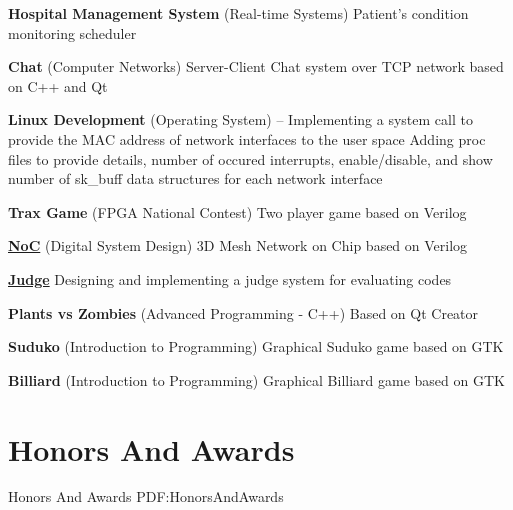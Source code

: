 \documentclass[a4paper,9pt,oneside]{article}
\begin{document}
\begin{body}
\BulletItem
\textbf{Hospital Management System} (Real-time Systems)
\hfill
{}
\SubBulletItem
Patient's condition monitoring scheduler


\BulletItem
\textbf{Chat} (Computer Networks)
\hfill
{}
\SubBulletItem
Server-Client Chat system over TCP network based on C++ and Qt

\BulletItem
\textbf{Linux Development} (Operating System)
\hfill
{} -- 
\SubBulletItem
Implementing a system call to provide the MAC address of network interfaces to the user space
\SubBulletItem
Adding proc files to provide details, number of occured interrupts, enable/disable, and show number of sk\_buff data structures for each network interface

\BulletItem
\textbf{Trax Game} (FPGA National Contest)
\hfill
{}
\SubBulletItem
Two player game based on Verilog

\BulletItem
\href{https://github.com/arminvakil/NoC}
{\textbf{NoC}} (Digital System Design)
\hfill
{}
\SubBulletItem
3D Mesh Network on Chip based on Verilog

\BulletItem
\href{https://github.com/Rmin1995/Judge}
{\textbf{Judge}}
\hfill
{}
\SubBulletItem
Designing and implementing a judge system for evaluating codes

\BulletItem
\textbf{Plants vs Zombies} (Advanced Programming - C++)
\hfill
{}
\SubBulletItem
Based on Qt Creator

\BulletItem
\textbf{Suduko} (Introduction to Programming)
\hfill
{}
\SubBulletItem
Graphical Suduko game based on GTK

\BulletItem
\textbf{Billiard} (Introduction to Programming)
\hfill
{}
\SubBulletItem
Graphical Billiard game based on GTK




\section
{Honors\newline
And\newline
Awards}
{Honors\newline
And\newline
Awards}
{PDF:HonorsAndAwards}


\end{body}
\end{document}
